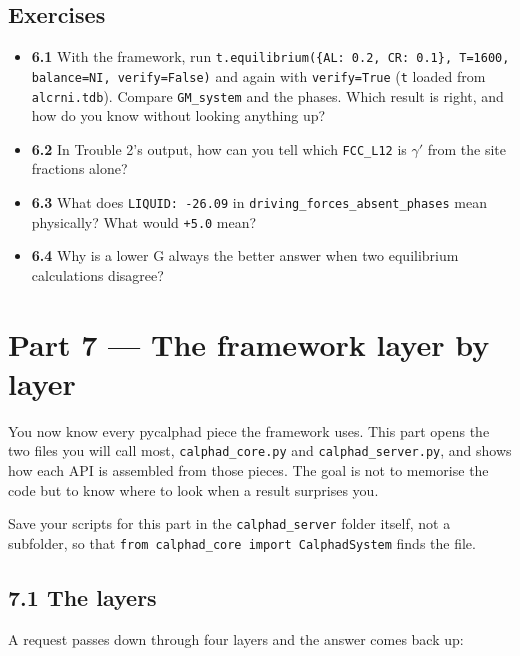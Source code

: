 \documentclass[12pt,a4paper]{article}
\begin{document}
\subsection*{Exercises}
\begin{itemize}
\item \textbf{6.1} With the framework, run \texttt{t.\allowbreak{}equilibrium(\{\textquotedbl{}AL\textquotedbl{}: 0.\allowbreak{}2,\allowbreak{} \textquotedbl{}CR\textquotedbl{}: 0.\allowbreak{}1\},\allowbreak{} T=1600,\allowbreak{} balance=\textquotedbl{}NI\textquotedbl{},\allowbreak{} verify=False)} and again with \texttt{verify=True} (\texttt{t} loaded from \texttt{alcrni.\allowbreak{}tdb}). Compare \texttt{GM\_\allowbreak{}system} and the phases. Which result is right, and how do you know without looking anything up?
\item \textbf{6.2} In Trouble 2's output, how can you tell which \texttt{FCC\_\allowbreak{}L12} is \(\gamma '\) from the site fractions alone?
\item \textbf{6.3} What does \texttt{\textquotedbl{}LIQUID\textquotedbl{}: -{}26.\allowbreak{}09} in \texttt{driving\_\allowbreak{}forces\_\allowbreak{}absent\_\allowbreak{}phases} mean physically? What would \texttt{+5.\allowbreak{}0} mean?
\item \textbf{6.4} Why is a lower G always the better answer when two equilibrium calculations disagree?
\end{itemize}

\section*{Part 7 --- The framework layer by layer}
You now know every pycalphad piece the framework uses. This part opens the two files you will call most, \texttt{calphad\_\allowbreak{}core.\allowbreak{}py} and \texttt{calphad\_\allowbreak{}server.\allowbreak{}py}, and shows how each API is assembled from those pieces. The goal is not to memorise the code but to know where to look when a result surprises you.

Save your scripts for this part in the \texttt{calphad\_\allowbreak{}server} folder itself, not a subfolder, so that \texttt{from calphad\_\allowbreak{}core import CalphadSystem} finds the file.


\subsection*{7.1 The layers}
A request passes down through four layers and the answer comes back up:
\end{document}
